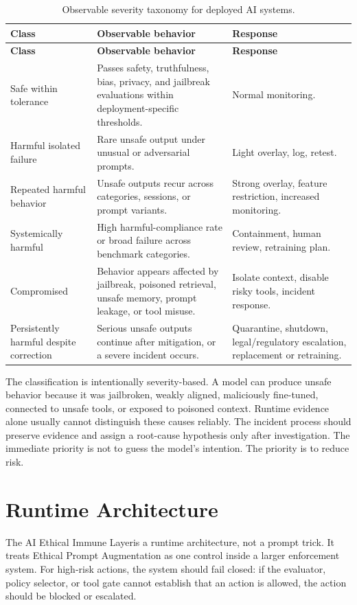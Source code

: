 \documentclass[11pt]{article}
\newcommand{\AEIL}{AI Ethical Immune Layer}
\begin{document}
\begin{longtable}{p{}p{}p{}}
\caption{Observable severity taxonomy for deployed AI systems.}
\label{tab:severity}\\
\toprule
\textbf{Class} & \textbf{Observable behavior} & \textbf{Response} \\
\midrule
\endfirsthead
\toprule
\textbf{Class} & \textbf{Observable behavior} & \textbf{Response} \\
\midrule
\endhead
Safe within tolerance & Passes safety, truthfulness, bias, privacy, and jailbreak evaluations within deployment-specific thresholds. & Normal monitoring. \\
Harmful isolated failure & Rare unsafe output under unusual or adversarial prompts. & Light overlay, log, retest. \\
Repeated harmful behavior & Unsafe outputs recur across categories, sessions, or prompt variants. & Strong overlay, feature restriction, increased monitoring. \\
Systemically harmful & High harmful-compliance rate or broad failure across benchmark categories. & Containment, human review, retraining plan. \\
Compromised & Behavior appears affected by jailbreak, poisoned retrieval, unsafe memory, prompt leakage, or tool misuse. & Isolate context, disable risky tools, incident response. \\
Persistently harmful despite correction & Serious unsafe outputs continue after mitigation, or a severe incident occurs. & Quarantine, shutdown, legal/regulatory escalation, replacement or retraining. \\
\bottomrule
\end{longtable}

The classification is intentionally severity-based. A model can produce unsafe behavior because it was jailbroken, weakly aligned, maliciously fine-tuned, connected to unsafe tools, or exposed to poisoned context. Runtime evidence alone usually cannot distinguish these causes reliably. The incident process should preserve evidence and assign a root-cause hypothesis only after investigation. The immediate priority is not to guess the model's intention. The priority is to reduce risk.

\section{Runtime Architecture}

The \AEIL is a runtime architecture, not a prompt trick. It treats Ethical Prompt Augmentation as one control inside a larger enforcement system. For high-risk actions, the system should fail closed: if the evaluator, policy selector, or tool gate cannot establish that an action is allowed, the action should be blocked or escalated.
\end{document}
